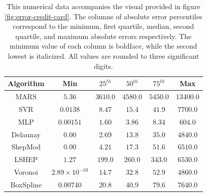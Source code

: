 \documentclass[smallextended,final]{svjour3}       %
\begin{document}
\begin{appendix}
\begin{table}
  \centering
  \begin{tabular}{c|c|c|c|c|c}
    \hline
    Algorithm & Min & $25^{th}$ & $50^{th}$ & $75^{th}$ & Max\\
    \hline
    MARS & $5.36$ & $3610.0$ & $4580.0$ & $5450.0$ & $13400.0$\\
    SVR & $0.0138$ & $8.47$ & $15.4$ & $41.9$ & $7700.0$\\
    MLP & $0.00151$ & $\mathbf{1.60}$ & $\mathbf{3.86}$ & $\mathbf{8.34}$ & $\mathbf{604.0}$\\
    Delaunay & $\mathbf{0.00}$ & $\mathit{2.69}$ & $\mathit{13.8}$ & $\mathit{35.0}$ & $\mathit{4840.0}$\\
    ShepMod & $\mathbf{0.00}$ & $4.21$ & $17.3$ & $51.6$ & $6510.0$\\
    LSHEP & $1.27$ & $199.0$ & $260.0$ & $343.0$ & $6530.0$\\
    Voronoi & $\mathit{2.89 \times 10^{-10}}$ & $14.7$ & $32.8$ & $52.9$ & $4860.0$\\
    BoxSpline & $0.00740$ & $20.8$ & $40.9$ & $79.6$ & $7640.0$\\
    \hline
  \end{tabular}
  \caption{This numerical data accompanies the visual provided in
    figure \ref{fig:error-credit-card}. The columns of absolute error
    percentiles correspond to the minimum, first quartile, median,
    second quartile, and maximum absolute errors respectively. The
    minimum value of each column is boldface, while the second lowest
    is italicized. All values are rounded to three significant
    digits.}
  \label{table:error-credit-card}
\end{table}


\end{appendix}
\end{document}
